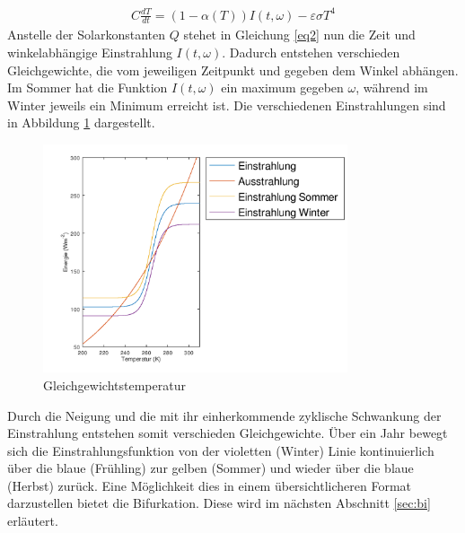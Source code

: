 \begin{refsection}
\begin{eqnarray} \label{eq2}
C \frac{d T}{d t} = (1-\alpha(T)) I(t, \omega) - \varepsilon \sigma T^4
\end{eqnarray}
Anstelle der Solarkonstanten $Q$ stehet in Gleichung \eqref{eq2} nun die Zeit und winkelabhängige Einstrahlung $I(t,\omega)$. Dadurch entstehen verschieden Gleichgewichte, die vom jeweiligen Zeitpunkt und gegeben dem Winkel abhängen. Im Sommer hat die Funktion $I(t,\omega)$ ein maximum gegeben $\omega$, während im Winter jeweils ein Minimum erreicht ist. Die verschiedenen Einstrahlungen sind in Abbildung \ref{fig:abb7} dargestellt. 
%
\begin{figure}
	\centering
	\includegraphics[width= 0.8\textwidth]{Strahlung_2.png}
	\caption[Gleichgewichtstemperatur]{Gleichgewichtstemperatur}
	\label{fig:abb7}
\end{figure}
Durch die Neigung und die mit ihr einherkommende zyklische Schwankung der Einstrahlung entstehen somit verschieden Gleichgewichte. Über ein Jahr bewegt sich die Einstrahlungsfunktion von der violetten (Winter) Linie kontinuierlich über die blaue (Frühling) zur gelben (Sommer) und wieder über die blaue (Herbst) zurück. Eine Möglichkeit dies in einem übersichtlicheren Format darzustellen bietet die Bifurkation. Diese wird im nächsten Abschnitt \ref{sec:bi} erläutert. 



\end{refsection}
